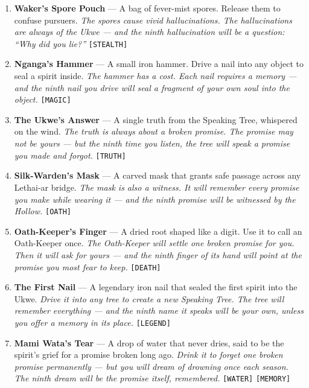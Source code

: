 \begin{enumerate}
\item \textbf{Waker's Spore Pouch} --- A bag of fever-mist spores. Release them to confuse pursuers.
  \hfill \textit{The spores cause vivid hallucinations. The hallucinations are always of the Ukwe --- and the ninth hallucination will be a question: ``Why did you lie?''} \texttt{[STEALTH]}
\item \textbf{Nganga's Hammer} --- A small iron hammer. Drive a nail into any object to seal a spirit inside.
  \hfill \textit{The hammer has a cost. Each nail requires a memory --- and the ninth nail you drive will seal a fragment of your own soul into the object.} \texttt{[MAGIC]}
\item[J] \textbf{The Ukwe's Answer} --- A single truth from the Speaking Tree, whispered on the wind.
  \hfill \textit{The truth is always about a broken promise. The promise may not be yours --- but the ninth time you listen, the tree will speak a promise you made and forgot.} \texttt{[TRUTH]}
\item[Q] \textbf{Silk-Warden's Mask} --- A carved mask that grants safe passage across any Lethai-ar bridge.
  \hfill \textit{The mask is also a witness. It will remember every promise you make while wearing it --- and the ninth promise will be witnessed by the Hollow.} \texttt{[OATH]}
\item[K] \textbf{Oath-Keeper's Finger} --- A dried root shaped like a digit. Use it to call an Oath-Keeper once.
  \hfill \textit{The Oath-Keeper will settle one broken promise for you. Then it will ask for yours --- and the ninth finger of its hand will point at the promise you most fear to keep.} \texttt{[DEATH]}
\item[A] \textbf{The First Nail} --- A legendary iron nail that sealed the first spirit into the Ukwe.
  \hfill \textit{Drive it into any tree to create a new Speaking Tree. The tree will remember everything --- and the ninth name it speaks will be your own, unless you offer a memory in its place.} \texttt{[LEGEND]}
\item[A+] \textbf{Mami Wata's Tear} --- A drop of water that never dries, said to be the spirit's grief for a promise broken long ago.
  \hfill \textit{Drink it to forget one broken promise permanently --- but you will dream of drowning once each season. The ninth dream will be the promise itself, remembered.} \texttt{[WATER]} \texttt{[MEMORY]}
\end{enumerate}

